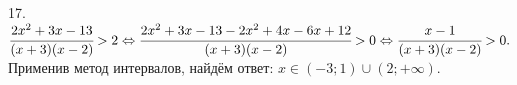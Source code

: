 17. $\cfrac{2x^2+3x-13}{(x+3)(x-2)}>2\Leftrightarrow\cfrac{2x^2+3x-13-2x^2+4x-6x+12}{(x+3)(x-2)}>0\Leftrightarrow \cfrac{x-1}{(x+3)(x-2)}>0.$
Применив метод интервалов, найдём ответ: $x\in(-3;1)\cup(2;+\infty).$
\begin{figure}[ht!]
\end{figure}\\

